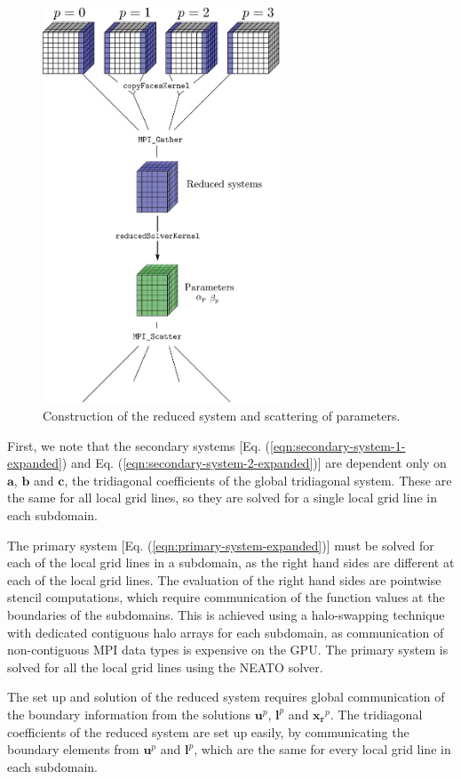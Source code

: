 \documentclass{elsarticle}
\begin{document}
\begin{figure}
\begin{center}
\includegraphics[width=200pt]{img/constructing-reduced-system.eps}
\caption{Construction of the reduced system and scattering of parameters.}
\label{fig:constructing-reduced-system}
\end{center}
\end{figure}

First, we note that the secondary systems
[Eq. (\ref{eqn:secondary-system-1-expanded}) and
 Eq. (\ref{eqn:secondary-system-2-expanded})]
are dependent only on $\bm{a}$, $\bm{b}$ and $\bm{c}$,
the tridiagonal coefficients of the global tridiagonal system.
These are the same for all local grid lines,
so they are solved for a single local grid line in each subdomain.

The primary system [Eq. (\ref{eqn:primary-system-expanded})] must be solved
for each of the local grid lines in a subdomain,
as the right hand sides are different at each of the local grid lines. 
The evaluation of the right hand sides are
pointwise stencil computations,
which require communication of the
function values at the boundaries of the subdomains.
This is achieved using a halo-swapping technique
with dedicated contiguous halo arrays for each subdomain,
as communication of non-contiguous MPI
data types is expensive on the GPU.
The primary system is solved for all the local grid lines
using the NEATO solver.

The set up and solution of the reduced system
requires global communication of the boundary information
from the solutions $\bm{u}^p$, $\bm{l}^p$ and $\bm{x_r}^p$.
The tridiagonal coefficients of the reduced system
are set up easily,
by communicating the boundary elements from
$\bm{u}^p$ and $\bm{l}^p$,
which are the same for every local grid line in each subdomain.
\end{document}
